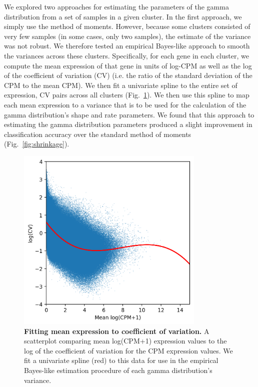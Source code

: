 We explored two approaches for estimating the parameters of the gamma distribution from a set of samples in a given cluster. In the first approach, we simply use the method of moments. However, because some clusters consisted of very few samples (in some cases, only two samples), the estimate of the variance was not robust. We therefore tested an empirical Bayes-like approach to smooth the variances across these clusters. Specifically, for each gene in each cluster, we compute the mean expression of that gene in units of log-CPM as well as the log of the coefficient of variation (CV) (i.e. the ratio of the standard deviation of the CPM to the mean CPM). We then fit a univariate spline to the entire set of expression, CV pairs across all clusters (Fig.~\ref{fig:mean_vs_cv}). We then use this spline to map each mean expression to a variance that is to be used for the calculation of the gamma distribution's shape and rate parameters.  We found that this approach to estimating the gamma distribution parameters produced a slight improvement in classification accuracy over the standard method of moments (Fig.~\ref{fig:shrinkage}).

\begin{figure}[htbp]
    \centerline{\includegraphics[width=9cm]{figures/mean_vs_coef_of_var.png}}
    \caption{\textbf{Fitting mean expression to coefficient of variation.} A scatterplot comparing mean log(CPM+1) expression values to the log of the coefficient of variation for the CPM expression values. We fit a univariate spline (red) to this data for use in the empirical Bayes-like estimation procedure of each gamma distribution's variance.}
    \label{fig:mean_vs_cv}
      \end{figure}
      
